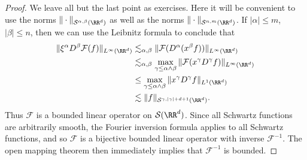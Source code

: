 \begin{proof}

    We leave all but the last point as exercises. Here it will be convenient to use the norms $\| \cdot \|_{\mathcal{S}^{\alpha,\beta}(\RR^d)}$ as well as the norms $\| \cdot \|_{\mathcal{S}^{n,m}(\RR^d)}$. If $|\alpha| \leq m$, $|\beta| \leq n$, then we can use the Leibnitz formula to conclude that
    \begin{align*}
        \| \xi^\alpha D^\beta \mathcal{F}(f) \|_{L^\infty(\RR^d)} &\lesssim_{\alpha,\beta} \| \mathcal{F}(D^\alpha(x^\beta f)) \|_{L^\infty(\RR^d)}\\
        &\lesssim_{\alpha,\beta} \max_{\gamma \leq \alpha \wedge \beta} \| \mathcal{F}(x^{\gamma} D^\gamma f) \|_{L^\infty(\RR^d)}\\
        &\leq \max_{\gamma \leq \alpha \wedge \beta} \| x^\gamma D^\gamma f \|_{L^1(\RR^d)}\\
        &\lesssim \| f \|_{\mathcal{S}^{\gamma,|\gamma| + d+1}(\RR^d)}.
    \end{align*}
    Thus $\mathcal{F}$ is a bounded linear operator on $\mathcal{S}(\RR^d)$. Since all Schwartz functions are arbitrarily smooth, the Fourier inversion formula applies to all Schwartz functions, and so $\mathcal{F}$ is a bijective bounded linear operator with inverse $\mathcal{F}^{-1}$. The open mapping theorem then immediately implies that $\mathcal{F}^{-1}$ is bounded.
\end{proof}

